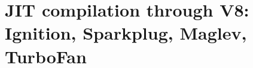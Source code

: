 \chapter{JIT compilation through V8: Ignition, Sparkplug, Maglev, TurboFan}
\label{ch:jit-compilation-through-v8-ignition}

